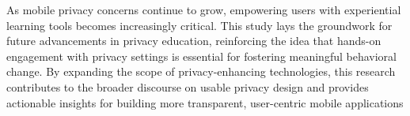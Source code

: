 \documentclass[acmlarge, nonacm]{acmart}
\begin{document}
As mobile privacy concerns continue to grow, empowering users with experiential learning tools becomes increasingly critical. This study lays the groundwork for future advancements in privacy education, reinforcing the idea that hands-on engagement with privacy settings is essential for fostering meaningful behavioral change. By expanding the scope of privacy-enhancing technologies, this research contributes to the broader discourse on usable privacy design and provides actionable insights for building more transparent, user-centric mobile applications





















\end{document}
